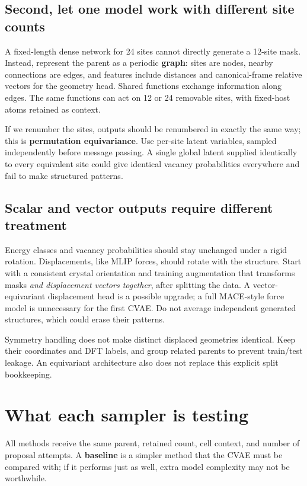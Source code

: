 \subsection*{Second, let one model work with different site counts}
A fixed-length dense network for 24 sites cannot directly generate a 12-site mask. Instead, represent the parent as a periodic \textbf{graph}: sites are nodes, nearby connections are edges, and features include distances and canonical-frame relative vectors for the geometry head. Shared functions exchange information along edges. The same functions can act on 12 or 24 removable sites, with fixed-host atoms retained as context.

If we renumber the sites, outputs should be renumbered in exactly the same way; this is \textbf{permutation equivariance}. Use per-site latent variables, sampled independently before message passing. A single global latent supplied identically to every equivalent site could give identical vacancy probabilities everywhere and fail to make structured patterns.

\subsection*{Scalar and vector outputs require different treatment}
Energy classes and vacancy probabilities should stay unchanged under a rigid rotation. Displacements, like MLIP forces, should rotate with the structure. Start with a consistent crystal orientation and training augmentation that transforms masks \emph{and displacement vectors together}, after splitting the data. A vector-equivariant displacement head is a possible upgrade; a full MACE-style force model is unnecessary for the first CVAE. Do not average independent generated structures, which could erase their patterns.

Symmetry handling does not make distinct displaced geometries identical. Keep their coordinates and DFT labels, and group related parents to prevent train/test leakage. An equivariant architecture also does not replace this explicit split bookkeeping.

\clearpage
\section{What each sampler is testing}\label{sec:baselines}

All methods receive the same parent, retained count, cell context, and number of proposal attempts. A \textbf{baseline} is a simpler method that the CVAE must be compared with; if it performs just as well, extra model complexity may not be worthwhile.

